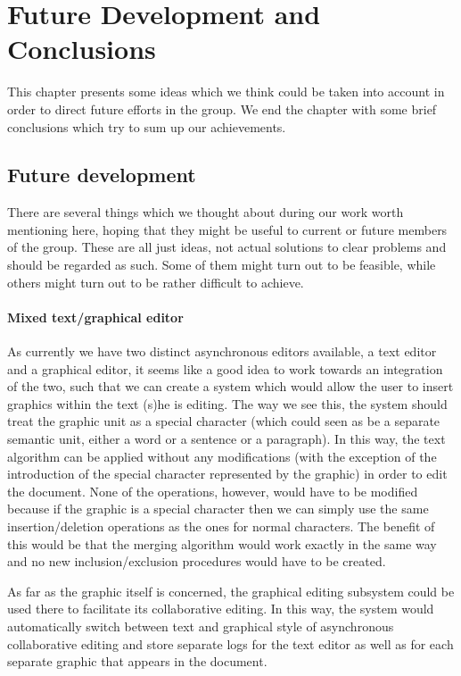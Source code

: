 \chapter{Future Development and Conclusions}

This chapter presents some ideas which we think could be taken into account in order to direct
future efforts in the group. We end the chapter with some brief conclusions which try to sum up our
achievements.

\section{Future development}

There are several things which we thought about during our work worth mentioning here, hoping
that they might be useful to current or future members of the group. These are all just ideas,
not actual solutions to clear problems and should be regarded as such. Some of them might turn
out to be feasible, while others might turn out to be rather difficult to achieve.

\subsubsection{Mixed text/graphical editor}

As currently we have two distinct asynchronous editors available, a text editor and a graphical
editor, it seems like a good idea to work towards an integration of the two, such that we can
create a system which would allow the user to insert graphics within the text (s)he is editing.
The way we see this, the system should treat the graphic unit as a special character (which could
seen as be a separate semantic unit, either a word or a sentence or a paragraph). In this way,
the text algorithm can be applied without any modifications (with the exception of the introduction
of the special character represented by the graphic) in order to edit the document. None of the
operations, however, would have to be modified because if the graphic is a special character then
we can simply use the same insertion/deletion operations as the ones for normal characters. The
benefit of this would be that the merging algorithm would work exactly in the same way and no new
inclusion/exclusion procedures would have to be created.


As far as the graphic itself is concerned, the graphical editing subsystem could be used there
to facilitate its collaborative editing. In this way, the system would automatically switch
between text and graphical style of asynchronous collaborative editing and store separate logs
for the text editor as well as for each separate graphic that appears in the document.

